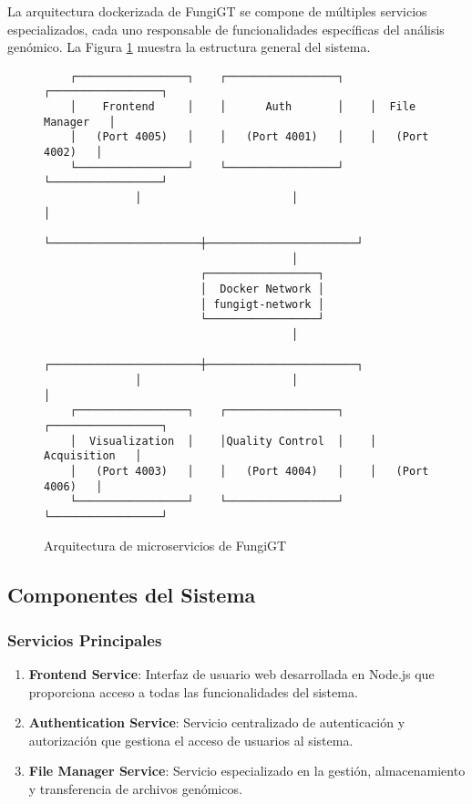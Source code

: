 \documentclass[12pt,a4paper]{article}
\begin{document}
La arquitectura dockerizada de FungiGT se compone de múltiples servicios especializados, cada uno responsable de funcionalidades específicas del análisis genómico. La Figura \ref{fig:architecture} muestra la estructura general del sistema.

\begin{figure}[h]
    \centering
    \begin{verbatim}
    ┌─────────────────┐    ┌─────────────────┐    ┌─────────────────┐
    │    Frontend     │    │      Auth       │    │  File Manager   │
    │   (Port 4005)   │    │   (Port 4001)   │    │   (Port 4002)   │
    └─────────────────┘    └─────────────────┘    └─────────────────┘
              │                       │                       │
              └───────────────────────┼───────────────────────┘
                                      │
                        ┌─────────────────┐
                        │  Docker Network │
                        │ fungigt-network │
                        └─────────────────┘
                                      │
              ┌───────────────────────┼───────────────────────┐
              │                       │                       │
    ┌─────────────────┐    ┌─────────────────┐    ┌─────────────────┐
    │  Visualization  │    │Quality Control  │    │   Acquisition   │
    │   (Port 4003)   │    │   (Port 4004)   │    │   (Port 4006)   │
    └─────────────────┘    └─────────────────┘    └─────────────────┘
    \end{verbatim}
    \caption{Arquitectura de microservicios de FungiGT}
    \label{fig:architecture}
\end{figure}

\subsection{Componentes del Sistema}

\subsubsection{Servicios Principales}

\begin{enumerate}
    \item \textbf{Frontend Service}: Interfaz de usuario web desarrollada en Node.js que proporciona acceso a todas las funcionalidades del sistema.
    
    \item \textbf{Authentication Service}: Servicio centralizado de autenticación y autorización que gestiona el acceso de usuarios al sistema.
    
    \item \textbf{File Manager Service}: Servicio especializado en la gestión, almacenamiento y transferencia de archivos genómicos.
\end{enumerate}
\end{document}
